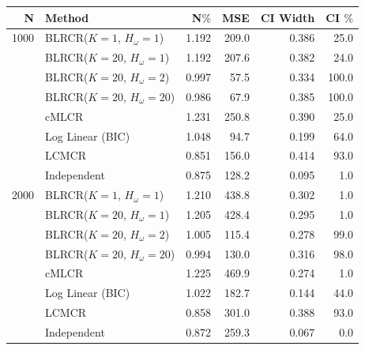 \documentclass[
  12pt,
]{article}
\begin{document}
\singlespacing
\begin{table}[H]
\centering
\begin{tabular}{||r l r r r r||} 
 \hline
N & Method & N$\%$ &MSE & CI Width & CI $\%$   \\ [0.5ex] 
 \hline\hline



 1000          & BLRCR($K=1$, $H_\omega=1$)  & 1.192   & 209.0   & 0.386   & 25.0 \\ 
               & BLRCR($K=20$, $H_\omega=1$)    & 1.192     & 207.6     & 0.382     & 24.0 \\ 
               & BLRCR($K=20$, $H_\omega=2$)    & 0.997     & 57.5     & 0.334     & 100.0 \\ 
               & BLRCR($K=20$, $H_\omega=20$)    & 0.986     & 67.9     & 0.385     & 100.0 \\ 
               & cMLCR       & 1.231       & 250.8      & 0.390      & 25.0 \\
               & Log Linear (BIC)  & 1.048      & 94.7     & 0.199     & 64.0 \\ 
               & LCMCR       & 0.851       & 156.0      & 0.414      & 93.0 \\ 
               & Independent & 0.875 & 128.2& 0.095& 1.0 \\ 

 \hline
 


 2000          & BLRCR($K=1$, $H_\omega=1$)  & 1.210   & 438.8   & 0.302   & 1.0 \\ 
               & BLRCR($K=20$, $H_\omega=1$)    & 1.205     & 428.4     & 0.295     & 1.0 \\
               & BLRCR($K=20$, $H_\omega=2$)    & 1.005     & 115.4     & 0.278     & 99.0 \\
               & BLRCR($K=20$, $H_\omega=20$)    & 0.994     & 130.0     & 0.316     & 98.0 \\ 
               & cMLCR       & 1.225       & 469.9      & 0.274      & 1.0 \\
               & Log Linear (BIC)  & 1.022      & 182.7     & 0.144     & 44.0 \\ 
               & LCMCR       & 0.858       & 301.0      & 0.388      & 93.0 \\ 
               & Independent & 0.872 & 259.3& 0.067& 0.0 \\ 

 \hline
 



\end{tabular}
\end{table}
\end{document}

